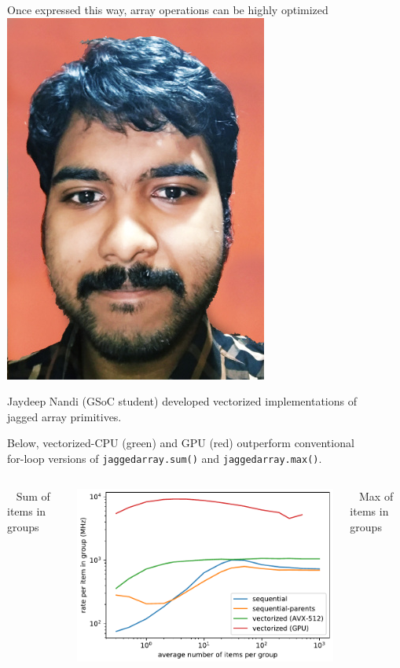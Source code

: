 \documentclass[aspectratio=169]{beamer}
\begin{document}
\begin{frame}{Once expressed this way, array operations can be highly optimized}
\vspace{0.25 cm}
\hfill \includegraphics[height=2.5 cm]{jaydeep.jpg}

\vspace{-2.5 cm}
Jaydeep Nandi (GSoC student) developed vectorized implementations of \\ jagged array primitives.

\vspace{0.25 cm}
Below, vectorized-CPU (green) and GPU (red) outperform conventional \\ for-loop versions of {\tt\small jaggedarray.sum()} and {\tt\small jaggedarray.max()}.

\vspace{0.5 cm}
\begin{columns}
\mbox{ } \hfill Sum of items in groups \hfill \mbox{ }

\includegraphics[width=\linewidth]{sum_rates_logy.pdf}

\mbox{ } \hfill Max of items in groups \hfill \mbox{ }


\end{columns}
\end{frame}
\end{document}
